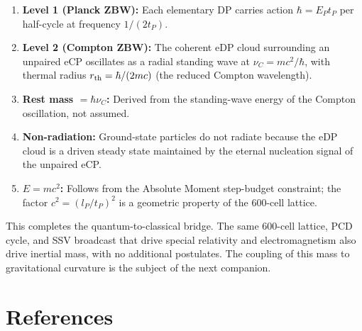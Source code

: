 \documentclass[12pt]{article}
\newcommand{\lP}{l_P}
\newcommand{\EP}{E_P}
\newcommand{\tP}{t_P}
\newcommand{\nuC}{\nu_C}
\begin{document}
\begin{enumerate}
  \item \textbf{Level 1 (Planck ZBW):} Each elementary DP carries action
    $\hbar = \EP\tP$ per half-cycle at frequency $1/(2\tP)$.

  \item \textbf{Level 2 (Compton ZBW):} The coherent eDP cloud surrounding
    an unpaired eCP oscillates as a radial standing wave at $\nuC =
    mc^2/\hbar$, with thermal radius $r_{\rm th} = \hbar/(2mc)$
    (the reduced Compton wavelength).

  \item \textbf{Rest mass $= \hbar\nuC$:} Derived from the standing-wave
    energy of the Compton oscillation, not assumed.

  \item \textbf{Non-radiation:} Ground-state particles do not radiate
    because the eDP cloud is a driven steady state maintained by the
    eternal nucleation signal of the unpaired eCP.

  \item \textbf{$E = mc^2$:} Follows from the Absolute Moment step-budget
    constraint; the factor $c^2 = (\lP/\tP)^2$ is a geometric property
    of the 600-cell lattice.
\end{enumerate}

This completes the quantum-to-classical bridge.  The same 600-cell lattice,
PCD cycle, and SSV broadcast that drive special relativity and
electromagnetism also drive inertial mass, with no additional postulates.
The coupling of this mass to gravitational curvature is the subject of the
next companion.

\section*{References}
\end{document}
